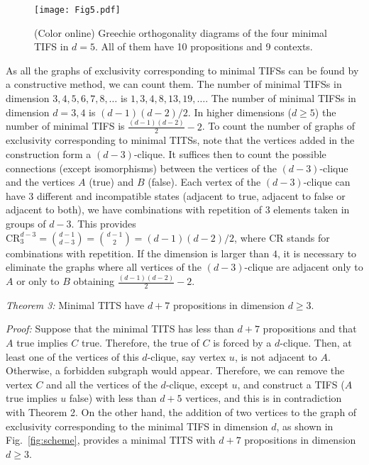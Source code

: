 \documentclass[%
 twocolumn,
 groupedaddress,
 showpacs,
 showkeys,
 preprintnumbers,
 amsmath,amssymb,
 aps,
 pra,
 longbibliography,
 floatfix,
 ]{revtex4-1}
\def\endproof{\vrule height6pt width6pt depth0pt}
\begin{document}

\begin{figure}
	\begin{center}
		\texttt{[image: Fig5.pdf]}
	\end{center}
	\caption{\label{fig:d5}
		(Color online)
		Greechie orthogonality diagrams of the four minimal
		TIFS in $d=5$. All of them have 10 propositions and 9 contexts.
		}
\end{figure}


As all the graphs of exclusivity corresponding to minimal TIFSs can be found by a constructive method, we can count them.
The number of minimal TIFSs in dimension $ 3,4,5,6,7,8,\ldots$ is $ 1,3,4,8,13,19,\ldots $.
The number of minimal TIFSs in dimension $ d = 3,4 $ is $ (d-1) (d-2) / 2 $. In higher dimensions ($ d \geq 5 $) the number of minimal TIFS is $ \frac {(d-1) (d-2)} {2} -2 $.
To count the number of graphs of exclusivity corresponding to minimal TITSs, note that the vertices added in the construction form a $(d-3)$-clique.
It suffices then to count the possible connections (except isomorphisms) between the vertices of the $(d-3)$-clique and the vertices $A$ (true) and $B$ (false). Each vertex of the $(d-3)$-clique can have $ 3 $ different and incompatible states (adjacent to true, adjacent to false or adjacent to both), we have combinations with repetition of 3 elements taken in groups of $ d-3 $. This provides $\mathrm{CR}^{d-3}_3 = \binom{d-1}{d-3} = \binom{d-1}{2} = (d-1) (d-2) / 2 $, where $\mathrm{CR}$ stands for combinations with repetition. If the dimension is larger than $ 4 $, it is necessary to eliminate the graphs where all vertices of the $(d-3)$-clique are adjacent only to $ A $ or only to $ B $ obtaining $ \frac{(d-1) (d-2)}{2} -2 $.


{\em Theorem 3:} Minimal TITS have $d+7$ propositions in dimension $d\geq 3$.


{\em Proof:} Suppose that the minimal TITS has less than $d+7$ propositions and that $A$ true implies $C$ true. 
Therefore, the true of $C$ is forced by a $d$-clique. Then, at least one of the vertices of this $d$-clique, say vertex $u$, is not adjacent to $A$. Otherwise, a forbidden subgraph would appear. Therefore, we can remove the vertex $C$ and all the vertices of the $d$-clique, except $u$, and construct a TIFS ($A$ true implies $u$ false) with less than $d+5$ vertices, and this is in contradiction with Theorem 2. On the other hand, the addition of two vertices to the graph of exclusivity corresponding to the minimal TIFS in dimension $d$, as shown in Fig.~\ref{fig:scheme}, provides a minimal TITS with $d+7$ propositions in dimension $d\geq 3$. \hfill \endproof
\end{document}
